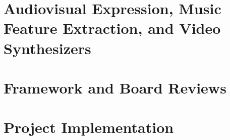\documentclass{report}
\begin{document}
\chapter{Audiovisual Expression, Music Feature Extraction, and Video Synthesizers}




\chapter{Framework and Board Reviews}



\chapter{Project Implementation}


\printbibliography
\end{document}
